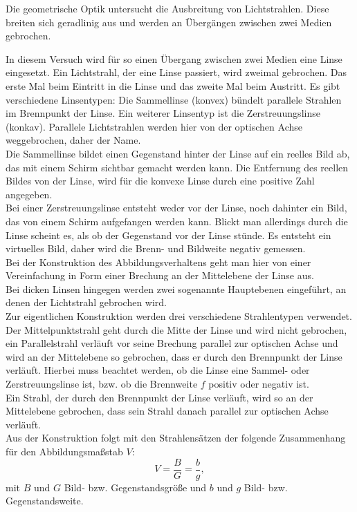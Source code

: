 Die geometrische Optik untersucht die Ausbreitung von Lichtstrahlen. Diese breiten sich geradlinig aus und werden an Übergängen zwischen zwei Medien gebrochen.

In diesem Versuch wird für so einen Übergang zwischen zwei Medien eine Linse eingesetzt. Ein Lichtstrahl, der eine Linse
passiert, wird zweimal gebrochen. Das erste Mal beim Eintritt in
die Linse und das zweite Mal beim Austritt.  Es gibt verschiedene
Linsentypen:  Die Sammellinse (konvex) bündelt parallele Strahlen im Brennpunkt der Linse. Ein weiterer Linsentyp ist die
Zerstreuungslinse (konkav). Parallele Lichtstrahlen werden hier von der optischen Achse weggebrochen, daher der Name.\\

Die Sammellinse bildet einen Gegenstand hinter der Linse auf ein reelles Bild ab, das mit einem Schirm sichtbar gemacht werden kann. Die Entfernung des reellen Bildes von der Linse, wird für die konvexe Linse durch eine positive Zahl angegeben.\\
Bei einer Zerstreuungslinse entsteht weder vor der Linse, noch dahinter ein
Bild, das von einem Schirm aufgefangen werden kann. Blickt man
allerdings durch die Linse scheint es, als ob der Gegenstand vor der
Linse stünde. Es entsteht ein virtuelles Bild, daher wird die Brenn- und Bildweite negativ gemessen.\\

Bei der Konstruktion des Abbildungsverhaltens geht man hier von einer Vereinfachung in Form einer Brechung an der Mittelebene der Linse aus.\\
Bei dicken Linsen hingegen werden zwei sogenannte
Hauptebenen eingeführt, an denen der Lichtstrahl gebrochen wird.\\
Zur eigentlichen Konstruktion werden drei verschiedene Strahlentypen
verwendet. Der Mittelpunktstrahl geht durch die Mitte der Linse und
wird nicht gebrochen, ein Parallelstrahl verläuft vor seine Brechung
parallel zur optischen Achse und wird an der Mittelebene so gebrochen,
dass er durch den Brennpunkt der Linse verläuft. Hierbei muss beachtet
werden, ob die Linse eine Sammel- oder Zerstreuungslinse ist, bzw. ob
die Brennweite $f$ positiv oder negativ ist.\\
Ein Strahl, der durch den Brennpunkt der Linse verläuft, wird so an der Mittelebene gebrochen, dass sein Strahl danach parallel zur optischen Achse verläuft.\\

Aus der Konstruktion folgt mit den Strahlensätzen der folgende
Zusammenhang für den Abbildungsmaßstab $V$:
%
\begin{equation}
  V = \frac{B}{G} = \frac{b}{g},
\end{equation}
%
mit $B$ und $G$ Bild- bzw. Gegenstandsgröße und $b$ und
$g$ Bild- bzw. Gegenstandsweite.\\

